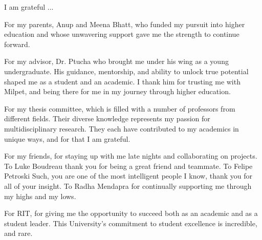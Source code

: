 \documentclass[12pt,american]{report}
\begin{document}
%
\vfill
\begin{center}
\indent I am grateful ...

For my parents, Anup and Meena Bhatt, who funded my pursuit into higher education and whose unwavering support gave me the strength to continue forward.

For my advisor, Dr. Ptucha who brought me under his wing as a young undergraduate.  His guidance, mentorship, and ability to unlock true potential shaped me as a student and an academic.  I thank him for trusting me with Milpet, and being there for me in my journey through higher education.  


For my thesis committee, which is filled with a number of professors from different fields.  Their diverse knowledge represents my passion for multidisciplinary research.  They each have contributed to my academics in unique ways, and for that I am grateful.


For my friends, for staying up with me late nights and collaborating on projects.  To Luke Boudreau thank you for being a great friend and teammate.  To Felipe Petroski Such, you are one of the most intelligent people I know, thank you for all of your insight. To Radha Mendapra for continually supporting me through my highs and my lows.

For RIT, for giving me the opportunity to succeed both as an academic and as a student leader.  This University's commitment to student excellence is incredible, and rare.


\end{center}
\vfill

\newcommand{\etc} {\emph{etc.\/}}
\newcommand{\etal}{\emph{et~al.\/}}
\newcommand{\eg}  {\emph{e.g.\/}}
\newcommand{\ie}  {\emph{i.e.\/}}
\end{document}
